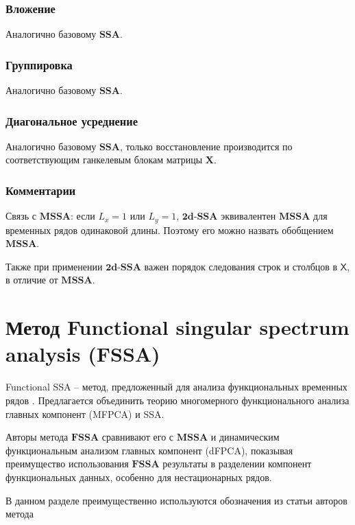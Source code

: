 \documentclass[a4paper, 11pt]{article}
\newcommand{\SSA}{\textbf{SSA}}
\newcommand{\MSSA}{\textbf{MSSA}}
\newcommand{\FSSA}{\textbf{FSSA}}
\newcommand{\DSSA}{\textbf{2d-SSA}}
\newcommand{\TS}{\mathsf{X}}
\begin{document}
\subsubsection{Вложение}

Аналогично базовому $\SSA$.

\subsubsection{Группировка}

Аналогично базовому $\SSA$.

\subsubsection{Диагональное усреднение}

Аналогично базовому $\SSA$, только восстановление производится по соответствующим ганкелевым блокам матрицы $\mathbf{X}$.

\subsubsection{Комментарии}

{Связь с $\MSSA$:} если $L_x = 1$ или $L_y = 1$, $\DSSA$ эквивалентен $\MSSA$ для временных рядов одинаковой длины. Поэтому его можно назвать обобщением $\MSSA$.

Также при применении $\DSSA$ важен порядок следования строк и столбцов в $\TS$, в отличие от $\MSSA$.



\newpage



\section{Метод Functional singular spectrum analysis (FSSA)}
\label{sec:fssa}

Functional SSA -- метод, предложенный для анализа функциональных временных рядов \cite{haghbin2019functionalsingularspectrumanalysis}. Предлагается объединить теорию многомерного функционального анализа главных компонент (MFPCA) и SSA.

Авторы метода $\FSSA$ сравнивают его с $\MSSA$ и динамическим функциональным анализом главных компонент (dFPCA), показывая преимущество использования $\FSSA$ результаты в разделении компонент функциональных данных, особенно для нестационарных рядов.

В данном разделе преимущественно используются обозначения из статьи \cite{haghbin2019functionalsingularspectrumanalysis}авторов метода 
\end{document}
